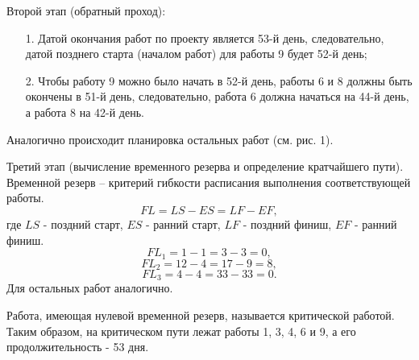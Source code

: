 Второй этап (обратный проход):
\begin{itemize}
	\item[1.] Датой окончания работ по проекту является 53-й день, следовательно, датой позднего старта (началом работ) для работы 9 будет 52-й день;
	\item[2.] Чтобы работу 9 можно было начать в 52-й день, работы 6 и 8 должны быть окончены в 51-й день, следовательно, работа 6 должна начаться на 44-й день, а работа 8 на 42-й день.
\end{itemize}
Аналогично происходит планировка остальных работ (см. рис. 1).

Третий этап (вычисление временного резерва и определение кратчайшего пути).
Временной резерв – критерий гибкости расписания выполнения соответствующей работы.
\begin{equation}
	FL = LS - ES = LF - EF,
\end{equation}
где $LS$ - поздний старт, $ES$ - ранний старт, $LF$ - поздний финиш, $EF$ - ранний финиш.
\begin{equation}
	FL_1 = 1 - 1 = 3 - 3 = 0,
\end{equation}
\begin{equation}
	FL_2 = 12 - 4 = 17 - 9 = 8,
\end{equation}
\begin{equation}
	FL_3 = 4 - 4 = 33 - 33 = 0.
\end{equation}
Для остальных работ аналогично.

Работа, имеющая нулевой временной резерв, называется критической работой. Таким образом, на критическом пути лежат работы 1, 3, 4, 6 и 9, а его продолжительность - 53 дня.

